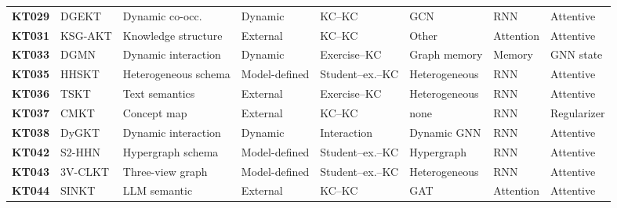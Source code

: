 \documentclass[lettersize,journal]{IEEEtran}
\begin{document}
\begin{table}[t]
\begin{tabular}{@{}ll>{\raggedright\arraybackslash}p{2.15cm}l>{\raggedright\arraybackslash}p{1.55cm}lll@{}}
\textbf{KT029} & DGEKT \cite{KT029_DGEKT_2024} & Dynamic co-occ. & Dynamic & KC--KC & GCN & RNN & Attentive \\
\textbf{KT031} & KSG-AKT \cite{KT031_KSGAKT_2022} & Knowledge structure & External & KC--KC & Other & Attention & Attentive \\
\textbf{KT033} & DGMN \cite{KT033_DGMN_2023} & Dynamic interaction & Dynamic & Exercise--KC & Graph memory & Memory & GNN state \\
\textbf{KT035} & HHSKT \cite{KT035_HHSKT_2023} & Heterogeneous schema & Model-defined & Student--ex.--KC & Heterogeneous & RNN & Attentive \\
\textbf{KT036} & TSKT \cite{KT036_TSKT_2024} & Text semantics & External & Exercise--KC & Heterogeneous & RNN & Attentive \\
\textbf{KT037} & CMKT \cite{KT037_CMKT_2022} & Concept map & External & KC--KC & none & RNN & Regularizer \\
\textbf{KT038} & DyGKT \cite{KT038_DyGKT_2024} & Dynamic interaction & Dynamic & Interaction & Dynamic GNN & RNN & Attentive \\
\textbf{KT042} & S2-HHN \cite{KT042_S2HHN_2023} & Hypergraph schema & Model-defined & Student--ex.--KC & Hypergraph & RNN & Attentive \\
\textbf{KT043} & 3V-CLKT \cite{KT043_3VCLKT_2024} & Three-view graph & Model-defined & Student--ex.--KC & Heterogeneous & RNN & Attentive \\
\textbf{KT044} & SINKT \cite{KT044_SINKT_2024} & LLM semantic & External & KC--KC & GAT & Attention & Attentive \\
\bottomrule
\end{tabular}
\end{table}
\end{document}

